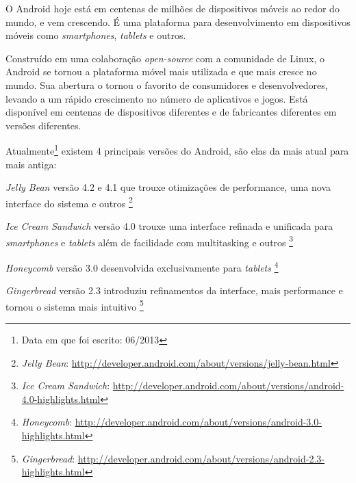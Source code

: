 \documentclass[a4paper,12pt,brazil]{book}
\begin{document}
\clearpage %
\thispagestyle{empty}

\thispagestyle{empty}

\doublespace

\clearpage

\pagestyle{body}

O Android hoje está em centenas de milhões de dispositivos móveis ao redor do mundo, e vem crescendo. É uma plataforma para desenvolvimento em dispositivos móveis como \emph{smartphones}, \emph{tablets} e outros. 

Construído em uma colaboração \emph{open-source} com a comunidade de Linux, o Android se tornou a plataforma móvel mais utilizada e que mais cresce no mundo. Sua abertura o tornou o favorito de consumidores e desenvolvedores, levando a um rápido crescimento no número de aplicativos e jogos. Está disponível em centenas de dispositivos diferentes e de fabricantes diferentes em versões diferentes.

Atualmente\footnote{Data em que foi escrito: 06/2013} existem 4 principais versões do Android, são elas da mais atual para mais antiga:
\bi
\item \emph{Jelly Bean} versão 4.2 e 4.1 que trouxe otimizações de performance, uma nova interface do sistema e outros
\footnote{\emph{Jelly Bean}: \href{http://developer.android.com/about/versions/jelly-bean.html}{http://developer.android.com/about/versions/jelly-bean.html}}
\item \emph{Ice Cream Sandwich} versão 4.0 trouxe uma interface refinada e unificada para \emph{smartphones} e \emph{tablets} além de facilidade com multitasking e outros
\footnote{\emph{Ice Cream Sandwich}: \href{http://developer.android.com/about/versions/android-4.0-highlights.html}{http://developer.android.com/about/versions/android-4.0-highlights.html}}
\item \emph{Honeycomb} versão 3.0 desenvolvida exclusivamente para \emph{tablets}
\footnote{\emph{Honeycomb}: \href{http://developer.android.com/about/versions/android-3.0-highlights.html}{http://developer.android.com/about/versions/android-3.0-highlights.html}}
\item \emph{Gingerbread} versão 2.3 introduziu refinamentos da interface, mais performance e tornou o sistema mais intuitivo
\footnote{\emph{Gingerbread}: \href{http://developer.android.com/about/versions/android-2.3-highlights.html}{http://developer.android.com/about/versions/android-2.3-highlights.html}}
\ei
\end{document}
